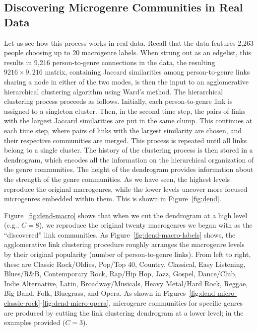 \documentclass[a4paper,12pt]{extarticle}
\begin{document}
\subsection{Discovering Microgenre Communities in Real Data}
Let us see how this process works in real data. Recall that the data features 2,263 people choosing up to 20 macrogenre labels. When strung out as an edgelist, this results in 9,216 person-to-genre connections in the data, the resulting $9216 \times 9,216$ matrix, containing Jaccard similarities among person-to-genre links sharing a node in either of the two modes, is then the input to an agglomerative hierarchical clustering algorithm using Ward's \citep{ward63} method. The hierarchical clustering process proceeds as follows. Initially, each person-to-genre link is assigned to a singleton cluster. Then, in the second time step, the pairs of links with the largest Jaccard similarities are put in the same clump. This continues at each time step, where pairs of links with the largest similarity are chosen, and their respective communities are merged. This process is repeated until all links belong to a single cluster. The history of the clustering process is then stored in a dendrogram, which encodes all the information on the hierarchical organization of the genre communities. The height of the dendrogram provides information about the strength of the genre communities. As we have seen, the highest levels reproduce the original macrogenres, while the lower levels uncover more focused microgenres embedded within them. This is shown in Figure~\ref{fig:dend}. 

Figure~\ref{fig:dend-macro} shows that when we cut the dendrogram at a high level (e.g., $C = 8$), we reproduce the original twenty macrogenres we began with as the ``discovered'' link communities. As Figure~\ref{fig:dend-macro-labels} shows, the agglomerative link clustering procedure roughly arranges the macrogenre levels by their original popularity (number of person-to-genre links). From left to right, these are Classic Rock/Oldies, Pop/Top 40, Country, Classical, Easy Listening, Blues/R\&B, Contemporary Rock, Rap/Hip Hop, Jazz, Gospel, Dance/Club, Indie Alternative, Latin, Broadway/Musicals, Heavy Metal/Hard Rock, Reggae, Big Band, Folk, Bluegrass, and Opera. As shown in Figures~\ref{fig:dend-micro-classic-rock}-\ref{fig:dend-micro-opera}, microgenre communities for specific genres are produced by cutting the link clustering dendrogram at a lower level; in the examples provided ($C = 3$). 
\end{document}
